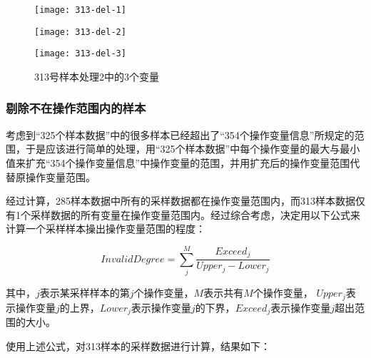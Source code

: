 \documentclass[bwprint]{gmcmthesis}
\begin{document}
\begin{figure}[htb]
    \centering
    \begin{minipage}[c]{0.35\textwidth}
        \centering
        \texttt{[image: 313-del-1]}
    \end{minipage}
    \begin{minipage}[c]{0.35\textwidth}
        \centering
        \texttt{[image: 313-del-2]}
    \end{minipage}
     \begin{minipage}[c]{0.35\textwidth}
        \centering
        \texttt{[image: 313-del-3]}
    \end{minipage}
    \caption{313号样本处理2中的3个变量}
\end{figure}




\FloatBarrier
\subsubsection{剔除不在操作范围内的样本}

考虑到“325个样本数据”中的很多样本已经超出了“354个操作变量信息”所规定的范围，于是应该进行简单的处理，用“325个样本数据”中每个操作变量的最大与最小值来扩充“354个操作变量信息”中操作变量的范围，并用扩充后的操作变量范围代替原操作变量范围。

经过计算，285样本数据中所有的采样数据都在操作变量范围内，而313样本数据仅有1个采样数据的所有变量在操作变量范围内。经过综合考虑，决定用以下公式来计算一个采样样本操出操作变量范围的程度：

\begin{equation}
	InvalidDegree=\sum^M_j{\frac{Exceed_j}{Upper_j - Lower_j}}
	\label{eq:range-invalid-degree}
\end{equation}

其中，$j$表示某采样样本的第$j$个操作变量，$M$表示共有$M$个操作变量， $Upper_j$表示操作变量$j$的上界，$Lower_j$表示操作变量$j$的下界，$Exceed_j$表示操作变量$j$超出范围的大小。

使用上述公式，对313样本的采样数据进行计算，结果如下：
\end{document}
